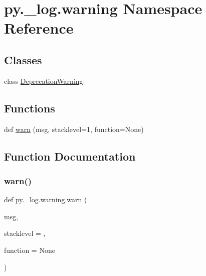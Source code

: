 \hypertarget{namespacepy_1_1__log_1_1warning}{}\section{py.\+\_\+log.\+warning Namespace Reference}
\label{namespacepy_1_1__log_1_1warning}
\subsection*{Classes}
\begin{DoxyCompactItemize}
\item 
class \hyperlink{classpy_1_1__log_1_1warning_1_1_deprecation_warning}{Deprecation\+Warning}
\end{DoxyCompactItemize}
\subsection*{Functions}
\begin{DoxyCompactItemize}
\item 
def \hyperlink{namespacepy_1_1__log_1_1warning_ae09bf623ea9cc04ce7a62f3ed0ee65c5}{warn} (msg, stacklevel=1, function=None)
\end{DoxyCompactItemize}


\subsection{Function Documentation}
\mbox{\label{namespacepy_1_1__log_1_1warning_ae09bf623ea9cc04ce7a62f3ed0ee65c5}} 
\subsubsection{\texorpdfstring{warn()}{warn()}}
{\footnotesize\ttfamily def py.\+\_\+log.\+warning.\+warn (\begin{DoxyParamCaption}\item[{}]{msg,  }\item[{}]{stacklevel = {},  }\item[{}]{function = {\ttfamily None} }\end{DoxyParamCaption})}

